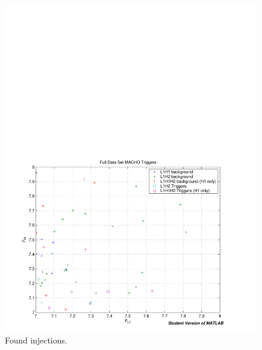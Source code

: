 \begin{figure}[p]
\begin{center}
\includegraphics[width=\textwidth]{analysis/figures/bkg_fgd_zoom}
\end{center}
\caption{\label{f:bkg_found}%
Found injections.
}
\end{figure}
